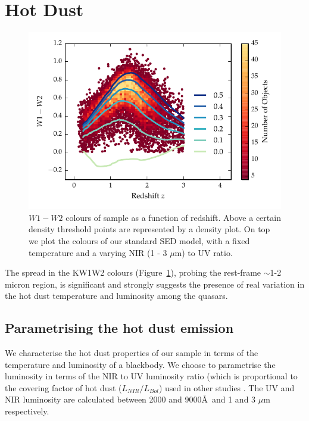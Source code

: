 \section{Hot Dust}

\begin{figure}
\centering
\includegraphics[width=\columnwidth]{figures/chapter05/w1w2_versus_redshift_ratio.pdf}
\caption{$W1 - W2$ colours of sample as a function of redshift. Above a certain density threshold points are represented by a density plot. On top we plot the colours of our standard SED model, with a fixed temperature and a varying NIR (1 - 3 $\mu$m) to UV ratio.}
  \label{fig:w1w2colorsratio}
\end{figure}

The spread in the KW1W2 colours (Figure~\ref{fig:w1w2colorsratio}), probing the rest-frame $\sim$1-2 micron region, is significant and strongly suggests the presence of real variation in the hot dust temperature and luminosity among the quasars. 

\subsection{Parametrising the hot dust emission}

We characterise the hot dust properties of our sample in terms of the temperature and luminosity of a blackbody.  
We choose to parametrise the luminosity in terms of the NIR to UV luminosity ratio (which is proportional to the covering factor of hot dust ($L_{NIR}/L_{Bol}$) used in other studies \citep{roseboom13}. 
The UV and NIR luminosity are calculated between 2000 and 9000\AA\, and 1 and 3 $\mu$m respectively.


